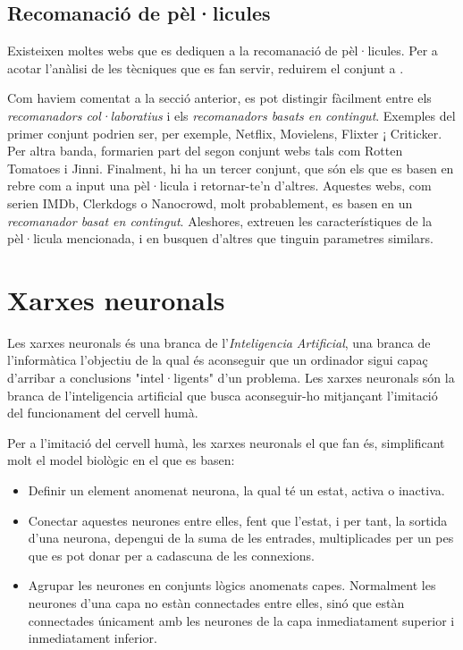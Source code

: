\subsection{Recomanació de pèl·licules}

Existeixen moltes webs que es dediquen a la recomanació de pèl·licules. Per a acotar l'anàlisi de les tècniques que es fan servir, reduirem el conjunt a \cite{top-ten-film-recommenders}.

Com haviem comentat a la secció anterior, es pot distingir fàcilment entre els \emph{recomanadors col·laboratius} i els \emph{recomanadors basats en contingut}. Exemples del primer conjunt podrien ser, per exemple, Netflix, Movielens, Flixter ¡ Criticker. Per altra banda, formarien part del segon conjunt webs tals com Rotten Tomatoes i Jinni. Finalment, hi ha un tercer conjunt, que són els que es basen en rebre com a input una pèl·licula i retornar-te'n d'altres. Aquestes webs, com serien IMDb, Clerkdogs o Nanocrowd, molt probablement, es basen en un \emph{recomanador basat en contingut}. Aleshores, extreuen les característiques de la pèl·licula mencionada, i en busquen d'altres que tinguin parametres similars.

\section{Xarxes neuronals}

Les xarxes neuronals és una branca de l'\emph{Inteligencia Artificial}, una branca de l'informàtica l'objectiu de la qual és aconseguir que un ordinador sigui capaç d'arribar a conclusions "intel·ligents" d'un problema. Les xarxes neuronals són la branca de l'inteligencia artificial que busca aconseguir-ho mitjançant l'imitació del funcionament del cervell humà.

Per a l'imitació del cervell humà, les xarxes neuronals el que fan és, simplificant molt el model biològic en el que es basen:

\begin{itemize}
	\item Definir un element anomenat neurona, la qual té un estat, activa o inactiva.
	\item Conectar aquestes neurones entre elles, fent que l'estat, i per tant, la sortida d'una neurona, depengui de la suma de les entrades, multiplicades per un pes que es pot donar per a cadascuna de les connexions.
	\item Agrupar les neurones en conjunts lògics anomenats capes. Normalment les neurones d'una capa no estàn connectades entre elles, sinó que estàn connectades únicament amb les neurones de la capa inmediatament superior i inmediatament inferior.
\end{itemize}

